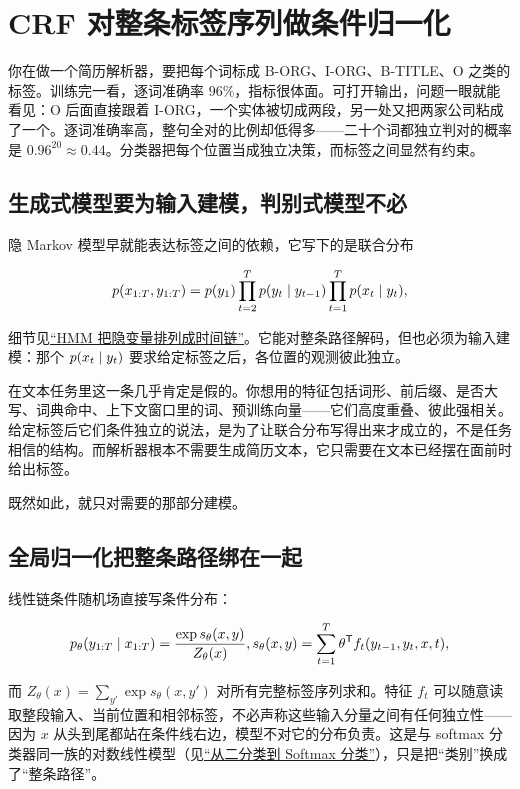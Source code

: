 \section{CRF 对整条标签序列做条件归一化}
\label{sec:13-Machine-Learning/07-Graphical-and-Sequential-Models/04}

你在做一个简历解析器，要把每个词标成 B-ORG、I-ORG、B-TITLE、O 之类的标签。训练完一看，逐词准确率 \(96\%\)，指标很体面。可打开输出，问题一眼就能看见：O 后面直接跟着 I-ORG，一个实体被切成两段，另一处又把两家公司粘成了一个。逐词准确率高，整句全对的比例却低得多——二十个词都独立判对的概率是 \(0.96^{20}\approx 0.44\)。分类器把每个位置当成独立决策，而标签之间显然有约束。

\subsection{生成式模型要为输入建模，判别式模型不必}

隐 Markov 模型早就能表达标签之间的依赖，它写下的是联合分布

\[
p(x_{1:T},y_{1:T})
=p(y_1)\prod_{t=2}^{T}p(y_t\mid y_{t-1})
\prod_{t=1}^{T}p(x_t\mid y_t),
\]

细节见\hyperref[sec:13-Machine-Learning/06-Probabilistic-Models/05]{``HMM 把隐变量排列成时间链''}。它能对整条路径解码，但也必须为输入建模：那个 \(p(x_t\mid y_t)\) 要求给定标签之后，各位置的观测彼此独立。

在文本任务里这一条几乎肯定是假的。你想用的特征包括词形、前后缀、是否大写、词典命中、上下文窗口里的词、预训练向量——它们高度重叠、彼此强相关。给定标签后它们条件独立的说法，是为了让联合分布写得出来才成立的，不是任务相信的结构。而解析器根本不需要生成简历文本，它只需要在文本已经摆在面前时给出标签。

既然如此，就只对需要的那部分建模。

\subsection{全局归一化把整条路径绑在一起}

线性链条件随机场直接写条件分布：

\[
p_\theta(y_{1:T}\mid x_{1:T})
=\frac{\exp s_\theta(x,y)}{Z_\theta(x)},
\space
s_\theta(x,y)=\sum_{t=1}^{T}\theta^{\mathsf{T}}f_t(y_{t-1},y_t,x,t),
\]

而 \(Z_\theta(x)=\sum_{y'}\exp s_\theta(x,y')\) 对所有完整标签序列求和。特征 \(f_t\) 可以随意读取整段输入、当前位置和相邻标签，不必声称这些输入分量之间有任何独立性——因为 \(x\) 从头到尾都站在条件线右边，模型不对它的分布负责。这是与 softmax 分类器同一族的对数线性模型（见\hyperref[sec:13-Machine-Learning/02-Linear-Models/03]{``从二分类到 Softmax 分类''}），只是把``类别''换成了``整条路径''。

